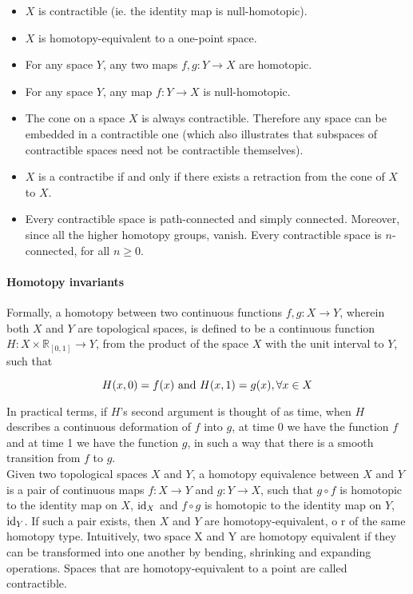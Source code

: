 \documentclass{homework}
\begin{document}
\begin{itemize}
    \item $X$ is contractible (ie. the identity map is null-homotopic). 
    \item $X$ is homotopy-equivalent to a one-point space. 
    \item For any space $Y$, any two maps $f, g: Y \rightarrow X$ are homotopic.
    \item For any space $Y$, any map $f: Y \rightarrow X$ is null-homotopic. 
    \item The cone on a space $X$ is always contractible. Therefore any space can be embedded in a contractible one (which also illustrates that subspaces of contractible spaces need not be contractible themselves).
    \item $X$ is a contractibe if and only if there exists a retraction from the cone of $X$ to $X$.
    \item Every contractible space is path-connected and simply connected. Moreover, since all the higher homotopy groups, vanish. Every contractible space is $n$-connected, for all $n \geq 0$.\\ 
\end{itemize}

\paragraph{\textbf{Homotopy invariants}}

Formally, a homotopy between two continuous functions $f, g: X \to Y$, wherein both $X$ and $Y$ are topological spaces, is defined to be a continuous function $H: X \times \mathds{R}_{[0,1]} \to Y$, from the product of the space $X$ with the unit interval to $Y$, such that 

$$
    H(x,0) = f(x) \textnormal{ and } H(x, 1) = g(x), \forall x \in X 
$$

In practical terms, if $H$'s second argument is thought of as time, when $H$ describes a continuous deformation of $f$ into $g$, at time 0 we have the function $f$ and at time 1 we have the function $g$, in such a way that there is a smooth transition from $f$ to $g$. \\

Given two topological spaces $X$ and $Y$, a homotopy equivalence between $X$ and $Y$ is a pair of continuous maps $f: X \to Y$ and $g: Y \to X$, such that $ g \circ f $ is homotopic to the identity map on $X$, $\textnormal{id}_X$ and $ f \circ g $ is homotopic to the identity map on $Y$, $\textnormal{id}_Y$. If such a pair exists, then $X$ and $Y$ are homotopy-equivalent, o r of the same homotopy type. Intuitively, two space X and Y are homotopy equivalent if they can be transformed into one another by bending, shrinking and expanding operations. Spaces that are homotopy-equivalent to a point are called contractible.
\end{document}

